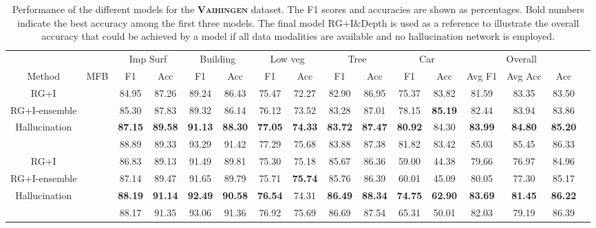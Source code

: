 \documentclass[journal]{IEEEtran}
\newcommand{\cmark}{\ding{51}}%
\newcommand{\xmark}{\ding{55}}%
\begin{document}
\begin{table*}[t]
\begin{center}
\begin{tabular}{lc|c|c|c|c|c|c|c|c|c|c|c|c|c|c|}
\cline{3-15}
 & & \multicolumn{2}{|c|}{Imp Surf} & \multicolumn{2}{c|}{Building} & \multicolumn{2}{c|}{Low veg} & \multicolumn{2}{c|}{Tree} & \multicolumn{2}{c|}{Car} & \multicolumn{3}{c|}{Overall}\\
\cline{1-15}
\multicolumn{1}{|c|}{Method} & \multicolumn{1}{|c|}{MFB} & F1 & Acc & F1 & Acc & F1 & Acc & F1 & Acc & F1 & Acc & Avg F1 & Avg Acc & Acc\\
\cline{1-15}
\multicolumn{1}{|c|}{RG+I} & \cmark & 84.95 & 87.26 & 89.24 & 86.43 & 75.47 & 72.27 & 82.90 & 86.95 & 75.37 & 83.82 & 81.59 & 83.35 & 83.50\\
\cline{2-15}
\multicolumn{1}{|c|}{RG+I-ensemble} & \cmark & 85.30 & 87.83 & 89.32 & 86.14 & 76.12 & 73.52 & 83.28 & 87.01 & 78.15 & {\bf85.19} & 82.44 & 83.94 & 83.86 \\
\cline{2-15}
\multicolumn{1}{|c|}{Hallucination} & \cmark & {\bf87.15} & {\bf89.58} & {\bf91.13} & {\bf88.30} & {\bf77.05} & {\bf74.33} & {\bf83.72} & {\bf87.47} & {\bf80.92} & 84.30 & {\bf83.99} & {\bf84.80} & {\bf85.20} \\
\hdashline
\multicolumn{1}{|c|}{RG+I\&Depth} & \cmark & 88.89 & 89.33 & 93.29 & 91.42 & 77.29 & 75.68 & 83.88 & 87.38 & 81.82 & 83.42 & 85.03 & 85.45 & 86.33 \\
\hline
\hline
\multicolumn{1}{|c|}{RG+I} & \xmark & 86.83 & 89.13 & 91.49 & 89.81 & 75.30 & 75.18 & 85.67 & 86.36 & 59.00 & 44.38 & 79.66 & 76.97 & 84.96\\
\hline
\multicolumn{1}{|c|}{RG+I-ensemble} & \xmark & 87.14 & 89.47 & 91.65 & 89.79 & 75.71 & {\bf75.74} & 85.76 & 86.39 & 60.01 & 45.09 & 80.05 & 77.30 & 85.17 \\
\hline
\multicolumn{1}{|c|}{Hallucination} & \xmark & {\bf88.19} & {\bf91.14} & {\bf92.49} & {\bf90.58} & {\bf76.54} & 74.31 & {\bf86.49} & {\bf88.34} & {\bf74.75} & {\bf62.90} & {\bf83.69} & {\bf81.45} & {\bf86.22}\\
\hdashline
\multicolumn{1}{|c|}{RG+I\&Depth} & \xmark & 88.17 & 91.35 & 93.06 & 91.36 & 76.92 & 75.69 & 86.69 & 87.54 & 65.31 & 50.01 & 82.03 & 79.19 & 86.39\\
\hline
\end{tabular}
\vspace{0.2cm}
\caption{Performance of the different models for the {\bf\scshape Vaihingen} dataset. The F1 scores and accuracies are shown as percentages. Bold numbers indicate the best accuracy among the first three models. The final model $\text{RG+I\&Depth}$ is used as a reference to illustrate the overall accuracy that could be achieved by a model if all data modalities are available and no hallucination network is employed.}
\label{tab:resultsMFBVaihingen}
\end{center}
\end{table*}
\end{document}
